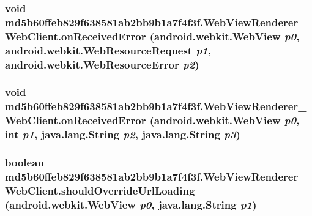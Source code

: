 \hypertarget{classmd5b60ffeb829f638581ab2bb9b1a7f4f3f_1_1_web_view_renderer___web_client_62578f73914345150ae2e2dd574e703b}{
\subsubsection[{onReceivedError}]{\setlength{\rightskip}{0pt plus 5cm}void md5b60ffeb829f638581ab2bb9b1a7f4f3f.WebViewRenderer\_\-WebClient.onReceivedError (android.webkit.WebView {\em p0}, \/  android.webkit.WebResourceRequest {\em p1}, \/  android.webkit.WebResourceError {\em p2})}}
\label{classmd5b60ffeb829f638581ab2bb9b1a7f4f3f_1_1_web_view_renderer___web_client_62578f73914345150ae2e2dd574e703b}


\hypertarget{classmd5b60ffeb829f638581ab2bb9b1a7f4f3f_1_1_web_view_renderer___web_client_3e92fd41a7e068430df1b5280e3e138a}{
\subsubsection[{onReceivedError}]{\setlength{\rightskip}{0pt plus 5cm}void md5b60ffeb829f638581ab2bb9b1a7f4f3f.WebViewRenderer\_\-WebClient.onReceivedError (android.webkit.WebView {\em p0}, \/  int {\em p1}, \/  java.lang.String {\em p2}, \/  java.lang.String {\em p3})}}
\label{classmd5b60ffeb829f638581ab2bb9b1a7f4f3f_1_1_web_view_renderer___web_client_3e92fd41a7e068430df1b5280e3e138a}


\hypertarget{classmd5b60ffeb829f638581ab2bb9b1a7f4f3f_1_1_web_view_renderer___web_client_56f79eb769429d223e2db82caeaa506e}{
\subsubsection[{shouldOverrideUrlLoading}]{\setlength{\rightskip}{0pt plus 5cm}boolean md5b60ffeb829f638581ab2bb9b1a7f4f3f.WebViewRenderer\_\-WebClient.shouldOverrideUrlLoading (android.webkit.WebView {\em p0}, \/  java.lang.String {\em p1})}}
\label{classmd5b60ffeb829f638581ab2bb9b1a7f4f3f_1_1_web_view_renderer___web_client_56f79eb769429d223e2db82caeaa506e}




